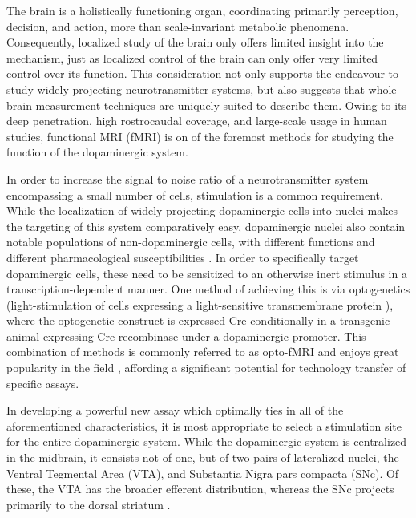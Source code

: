 The brain is a holistically functioning organ, coordinating primarily perception, decision, and action, more than scale-invariant metabolic phenomena.
Consequently, localized study of the brain only offers limited insight into the mechanism, just as localized control of the brain can only offer very limited control over its function.
This consideration not only supports the endeavour to study widely projecting neurotransmitter systems, but also suggests that whole-brain measurement techniques are uniquely suited to describe them.
Owing to its deep penetration, high rostrocaudal coverage, and large-scale usage in human studies, functional MRI (fMRI) is on of the foremost methods for studying the function of the dopaminergic system.

In order to increase the signal to noise ratio of a neurotransmitter system encompassing a small number of cells, stimulation is a common requirement.
While the localization of widely projecting dopaminergic cells into nuclei makes the targeting of this system comparatively easy, dopaminergic nuclei also contain notable populations of non-dopaminergic cells, with different functions and different pharmacological susceptibilities \cite{Taylor2014}.
In order to specifically target dopaminergic cells, these need to be sensitized to an otherwise inert stimulus in a transcription-dependent manner.
One method of achieving this is via optogenetics (light-stimulation of cells expressing a light-sensitive transmembrane protein \cite{Boyden2005}), where the optogenetic construct is expressed Cre-conditionally \cite{Orban1992} in a transgenic animal expressing Cre-recombinase under a dopaminergic promoter.
This combination of methods is commonly referred to as opto-fMRI and enjoys great popularity in the field \cite{Desai2011,Grandjean2019}, affording a significant potential for technology transfer of specific assays.

In developing a powerful new assay which optimally ties in all of the aforementioned characteristics, it is most appropriate to select a stimulation site for the entire dopaminergic system.
While the dopaminergic system is centralized in the midbrain, it consists not of one, but of two pairs of lateralized nuclei, the Ventral Tegmental Area (VTA), and Substantia Nigra pars compacta (SNc).
Of these, the VTA has the broader efferent distribution, whereas the SNc projects primarily to the dorsal striatum \cite{Pan2010}.

